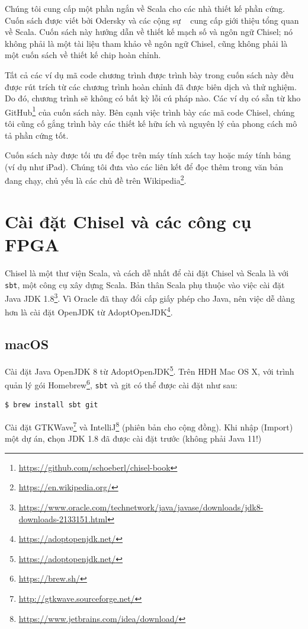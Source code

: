 \documentclass[%
    10pt,
    headinclude, footexclude,
    openright, %
    notitlepage,
    cleardoubleempty,
    headsepline,
    pointlessnumbers,
    bibtotoc, idxtotoc,
    ]{scrbook}
\newcommand{\code}[1]{{\small{\texttt{#1}}}}
\newcommand{\myref}[2]{\href{#1}{#2}}
\renewcommand{\myref}[2]{{#2}{\footnote{\url{#1}}}}
\begin{document}
Chúng tôi cung cấp một phần ngắn về Scala cho các nhà thiết kế phần cứng. 
Cuốn sách được viết bởi Odersky và các cộng sự ~\cite{Scala} cung cấp giới thiệu tổng quan về Scala.
Cuốn sách này hướng dẫn về thiết kế mạch số và ngôn ngữ Chisel; nó không phải là một tài liệu tham khảo về ngôn ngữ Chisel, cũng không phải là một cuốn sách về thiết kế chip hoàn chỉnh.

Tất cả các ví dụ mã code chương trình được trình bày trong cuốn sách này đều được rút trích từ các chương trình hoàn chỉnh đã được biên dịch và thử nghiệm. Do đó, chương trình sẽ không có bất kỳ lỗi cú pháp nào. Các ví dụ có sẵn từ \myref{https://github.com/schoeberl/chisel-book}{kho GitHub} của cuốn sách này.
Bên cạnh việc trình bày các mã code Chisel, chúng tôi cũng cố gắng trình bày các thiết kế hữu ích và nguyên lý của phong cách mô tả phần cứng tốt.

Cuốn sách này được tối ưu để đọc trên máy tính xách tay hoặc máy tính bảng (ví dụ như iPad).
Chúng tôi đưa vào các liên kết để đọc thêm trong văn bản đang chạy, chủ yếu là các chủ đề trên
\myref{https://en.wikipedia.org/}{Wikipedia}.

\section{Cài đặt Chisel và các công cụ FPGA}

Chisel là một thư viện Scala, và cách dễ nhất để cài đặt Chisel và Scala là với \code{sbt}, một công cụ xây dựng Scala. Bản thân Scala phụ thuộc vào việc cài đặt \myref{https://www.oracle.com/technetwork/java/javase/downloads/jdk8-downloads-2133151.html}{Java JDK 1.8}. Vì Oracle đã thay đổi cấp giấy phép cho Java, nên việc dễ dàng hơn là cài đặt OpenJDK từ \myref{https://adoptopenjdk.net/}{AdoptOpenJDK}.

\subsection{macOS}

Cài đặt Java OpenJDK 8 từ \myref{https://adoptopenjdk.net/}{AdoptOpenJDK}.
Trên HĐH Mac OS X, với trình quản lý gói \myref{https://brew.sh/}{Homebrew},
\code{sbt} và git có thể được cài đặt như sau:

\begin{verbatim}
$ brew install sbt git
\end{verbatim}

Cài đặt \myref{http://gtkwave.sourceforge.net/}{GTKWave} và
\myref{https://www.jetbrains.com/idea/download/}{IntelliJ} (phiên bản cho cộng đồng).
Khi nhập (Import) một dự án, {\textbf chọn JDK 1.8} đã được cài đặt trước (không phải Java 11!)
\end{document}
